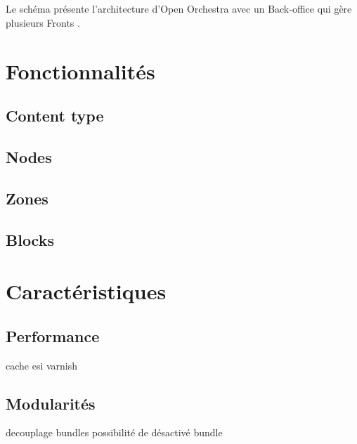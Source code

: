 	    \paragraph{}	
		Le schéma présente l'architecture d'Open Orchestra avec un \og Back-office \fg{} qui gère plusieurs \og Fronts \fg{}.
   
\chapter{Fonctionnalités}
         \section{Content type}
          \section{Nodes}  
          \section{Zones}  
          \section{Blocks}  
\chapter{Caractéristiques}
   \section{Performance}
   cache esi
   varnish 
   \section{Modularités}
   decouplage bundles
   possibilité de désactivé bundle
        
        
        